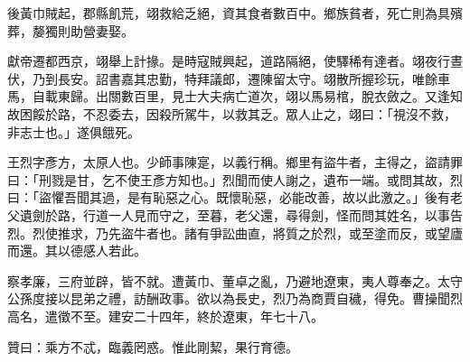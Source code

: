 \begin{pinyinscope}
後黃巾賊起，郡縣飢荒，翊救給乏絕，資其食者數百中。鄉族貧者，死亡則為具殯葬，嫠獨則助營妻娶。

獻帝遷都西京，翊舉上計掾。是時寇賊興起，道路隔絕，使驛稀有達者。翊夜行晝伏，乃到長安。詔書嘉其忠勤，特拜議郎，遷陳留太守。翊散所握珍玩，唯餘車馬，自載東歸。出關數百里，見士大夫病亡道次，翊以馬易棺，脫衣斂之。又逢知故困餒於路，不忍委去，因殺所駕牛，以救其乏。眾人止之，翊曰：「視沒不救，非志士也。」遂俱餓死。

王烈字彥方，太原人也。少師事陳寔，以義行稱。鄉里有盜牛者，主得之，盜請罪曰：「刑戮是甘，乞不使王彥方知也。」烈聞而使人謝之，遺布一端。或問其故，烈曰：「盜懼吾聞其過，是有恥惡之心。既懷恥惡，必能改善，故以此激之。」後有老父遺劍於路，行道一人見而守之，至暮，老父還，尋得劍，怪而問其姓名，以事告烈。烈使推求，乃先盜牛者也。諸有爭訟曲直，將質之於烈，或至塗而反，或望廬而還。其以德感人若此。

察孝廉，三府並辟，皆不就。遭黃巾、董卓之亂，乃避地遼東，夷人尊奉之。太守公孫度接以昆弟之禮，訪酬政事。欲以為長史，烈乃為商賈自穢，得免。曹操聞烈高名，遣徵不至。建安二十四年，終於遼東，年七十八。

贊曰：乘方不忒，臨義罔惑。惟此剛絜，果行育德。


\end{pinyinscope}